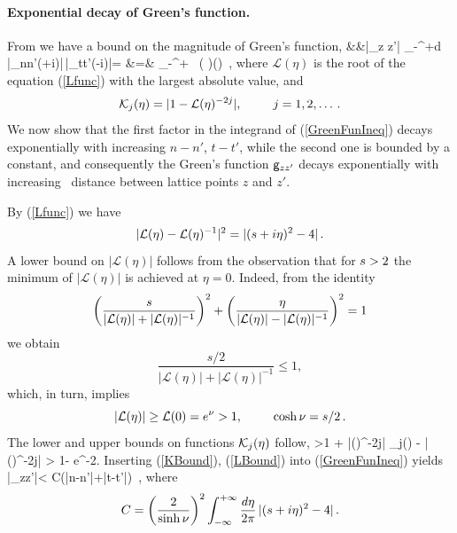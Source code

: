 \documentclass[12pt]{iopart}
\begin{document}
\paragraph{Exponential decay of Green's function.}
From  we have a bound on the magnitude of 
Green's function,
\bea
    &&|\gd_{z z'}|  \leq {}\int_{-\infty}^{+\infty}d\eta\,
              |\gd_{nn'}(+i\eta)|\,|\gd_{tt'}(-i\eta)|=
    \continue
    &=&
\int_{-\infty}^{+\infty} \,
 \left( \right)\left(\right)
\,,
\label{GreenFunIneq}
\eea
where  $\mathcal{L}(\eta)$ is the root of the  equation (\ref{Lfunc})
with the largest absolute value, and
\[ %
 \K_{j}(\eta) =|1-\mathcal{L}(\eta)^{-2j}|, \qquad j=1,2,\dots \,.
\] %
We now show that the first factor in the integrand of  (\ref{GreenFunIneq})
decays  exponentially with increasing $n-n'$, $t-t'$, while the second
one is bounded by a constant, and consequently
the Green's function $\mathsf{g}_{zz'}$ decays exponentially
with increasing \spt\ distance between lattice points $z$ and $z'$.

By  (\ref{Lfunc}) we have
\[
  |\mathcal{L}(\eta)-\mathcal{L}(\eta)^{-1}|^2 =|(s+i\eta)^2-4|
  \,.
\]
A lower bound on $|\mathcal{L}(\eta)|$ follows from the observation that
for $s>2$  the  minimum of
$|\mathcal{L}(\eta)|$ is achieved at $\eta=0$. Indeed, from  the identity
\[
\left(\frac{s}{|\mathcal{L}(\eta)|+|\mathcal{L}(\eta)|^{-1}}\right)^2
+ \left(\frac{\eta}{|\mathcal{L}(\eta)|-|\mathcal{L}(\eta)|^{-1}}\right)^2=1
\]
we obtain
\[
\frac{s/2}{|\mathcal{L}(\eta)|+|\mathcal{L}(\eta)|^{-1}}\leq 1,
\]
which, in turn, implies
\begin{equation}
|\mathcal{L}(\eta)|\geq \mathcal{L}(0)= e^\nu >1, \hspace*{25pt}  \cosh \nu =s/2
\,.
\label{LBound}
\end{equation}
The lower and upper bounds  on functions $\mathcal{K}_{j}(\eta)$ follow,
 >1 + |(\eta)^{-2j}| \geq \K_{j}(\eta)  - |(\eta)^{-2j}| > 1- e^{-2\nu}.
Inserting  (\ref{KBound}), (\ref{LBound}) into  (\ref{GreenFunIneq}) yields
 \beq
 |\gd_{zz'}|< C\exp(\nu|n-n'|+\nu|t-t'|)
\,,
where
\begin{equation}
C=\left(\frac{2}{\sinh \nu}\right)^2 \int_{-\infty}^{+\infty}
        \frac{d\eta}{2\pi}\,|(\edit{s}+i\eta)^2-4|
\,.
\end{equation}
\end{document}
